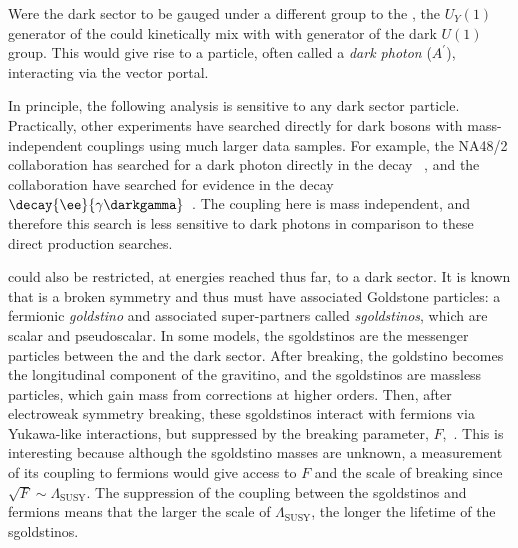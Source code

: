 Were the dark sector to be gauged under a different group to the \sm, the $U_Y(1)$ generator of the
\sm could kinetically mix with with generator
of the dark $U(1)$ group.
This would give rise to a particle, often called a \emph{dark photon} ($A^\prime$), interacting
via the vector portal.

In principle, the following analysis is sensitive to any dark sector particle.
Practically, other experiments have searched directly for dark bosons with mass-independent
couplings using much larger data samples.
For example, the NA48/2 collaboration has searched for a dark photon directly in the decay
\decay{\piz}{\gamma\darkgamma}~\cite{CERNNA48/2:2015lha}, and the \babar collaboration have
searched for evidence in the decay $\decay{\ee}{\gamma\darkgamma}$~\cite{Lees:2014xha}.
The coupling here is mass independent, and therefore this search is less sensitive to dark photons
in comparison to these direct production searches.


\SUSY could also be restricted, at energies reached thus far, to a dark sector.
It is known that \SUSY is a broken symmetry and thus must have associated Goldstone particles:
a fermionic \emph{goldstino} and associated super-partners called \emph{sgoldstinos}, which are
scalar and pseudoscalar.
In some models, the sgoldstinos are the messenger particles between the \sm and the dark \SUSY
sector.
After \SUSY breaking, the goldstino becomes the longitudinal component of the gravitino, and the
sgoldstinos are massless particles, which gain mass from corrections at higher orders.
Then, after electroweak symmetry breaking, these sgoldstinos interact with \sm fermions via
Yukawa-like interactions, but suppressed by the \SUSY breaking parameter,
$F$,~\cite{Alekhin:2015byh}.
This is interesting because although the sgoldstino masses are unknown, a measurement of its
coupling to fermions would give access to $F$ and the scale of \SUSY breaking since
$\sqrt{F}\sim\Lambda_\mathrm{SUSY}$.
The suppression of the coupling between the sgoldstinos and fermions means that the larger the
scale of $\Lambda_\mathrm{SUSY}$, the longer the lifetime of the sgoldstinos.


